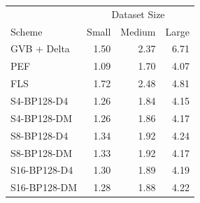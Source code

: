 \begin{tabular}{lrrr}
\toprule
 & \multicolumn{3}{c}{Dataset Size} \\
Scheme & Small & Medium & Large \\
\midrule
GVB + Delta & 1.50 & 2.37 & 6.71 \\
PEF & 1.09 & 1.70 & 4.07 \\
FLS & 1.72 & 2.48 & 4.81 \\
S4-BP128-D4 & 1.26 & 1.84 & 4.15 \\
S4-BP128-DM & 1.26 & 1.86 & 4.17 \\
S8-BP128-D4 & 1.34 & 1.92 & 4.24 \\
S8-BP128-DM & 1.33 & 1.92 & 4.17 \\
S16-BP128-D4 & 1.30 & 1.89 & 4.19 \\
S16-BP128-DM & 1.28 & 1.88 & 4.22 \\
\bottomrule
\end{tabular}
